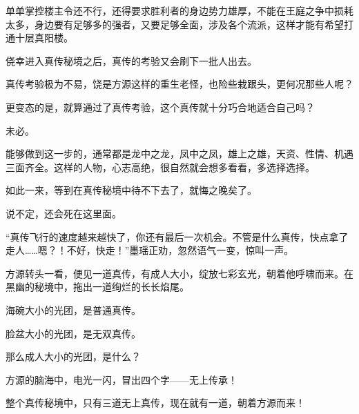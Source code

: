 \begin{this_body}
单单掌控楼主令还不行，还得要求胜利者的身边势力雄厚，不能在王庭之争中损耗太多，身边要有足够多的强者，又要足够全面，涉及各个流派，这样才能有希望打通十层真阳楼。

侥幸进入真传秘境之后，真传的考验又会刷下一批人出去。

真传考验极为不易，饶是方源这样的重生老怪，也险些栽跟头，更何况那些人呢？

更变态的是，就算通过了真传考验，这个真传就十分巧合地适合自己吗？

未必。

能够做到这一步的，通常都是龙中之龙，凤中之凤，雄上之雄，天资、性情、机遇三面齐全。这样的人物，心志高绝，很自然就会想多看看，多选择选择。

如此一来，等到在真传秘境中待不下去了，就悔之晚矣了。

说不定，还会死在这里面。

“真传飞行的速度越来越快了，你还有最后一次机会。不管是什么真传，快点拿了走人……嗯？！不好，快走！”墨瑶正劝，忽然语气一变，惊叫一声。

方源转头一看，便见一道真传，有成人大小，绽放七彩玄光，朝着他呼啸而来。在黑幽的秘境中，拖出一道绚烂的长长焰尾。

海碗大小的光团，是普通真传。

脸盆大小的光团，是无双真传。

那么成人大小的光团，是什么？

方源的脑海中，电光一闪，冒出四个字——无上传承！

整个真传秘境中，只有三道无上真传，现在就有一道，朝着方源而来！

\end{this_body}

